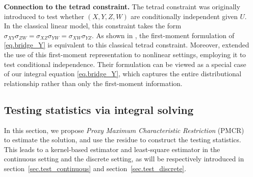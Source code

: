 \documentclass[
  12pt]{article}
\def\mH{\mathbb{H}}
\begin{document}
\textbf{Connection to the tetrad constraint.} The tetrad constraint \citep{spearman1961general} was originally introduced to test whether $(X,Y,Z,W)$ are conditionally independent given $U$. In the classical linear model, this constraint takes the form $\sigma_{XY}\sigma_{ZW} = \sigma_{XZ}\sigma_{YW} = \sigma_{XW}\sigma_{YZ}$. As shown in \cite{ying2025generalized}, the first-moment formulation of \eqref{eq.bridge_Y} is equivalent to this classical tetrad constraint. Moreover, \cite{ying2025generalized} extended the use of this first-moment representation to nonlinear settings, employing it to test conditional independence. Their formulation can be viewed as a special case of our integral equation \eqref{eq.bridge_Y}, which captures the entire distributional relationship rather than only the first-moment information.


\subsection{Testing statistics via integral solving}\label{sec.equivalent}

In this section, we propose \emph{Proxy Maximum Characteristic Restriction} (PMCR) to estimate the solution, and use the residue to construct the testing statistics. This leads to a kernel-based estimator and least-square estimator in the continuous setting and the discrete setting, as will be respectively introduced in section~\ref{sec.test_continuous} and section~\ref{sec.test_discrete}. 


\end{document}
